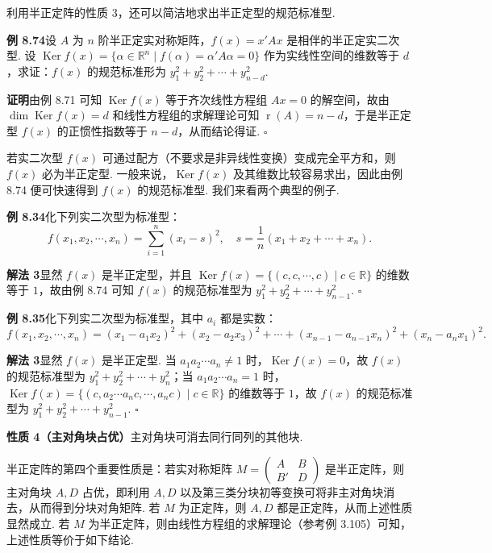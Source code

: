 \documentclass[UTF8,12pt,a4paper,fontset=fandol]{ctexart}
\begin{document}
利用半正定阵的性质 3，还可以简洁地求出半正定型的规范标准型.

\noindent\textbf{例 8.74}\quad 设 $A$ 为 $n$ 阶半正定实对称矩阵，$f(x)=x'Ax$ 是相伴的半正定实二次型. 设 $\operatorname{Ker} f(x)=\{\alpha\in\mathbb{R}^n\mid f(\alpha)=\alpha'A\alpha=0\}$ 作为实线性空间的维数等于 $d$，求证：$f(x)$ 的规范标准形为 $y_1^2+y_2^2+\cdots+y_{n-d}^2$.

\noindent\textbf{证明}\quad 由例 8.71 可知 $\operatorname{Ker} f(x)$ 等于齐次线性方程组 $Ax=0$ 的解空间，故由 $\dim\operatorname{Ker} f(x)=d$ 和线性方程组的求解理论可知 $\operatorname{r}(A)=n-d$，于是半正定型 $f(x)$ 的正惯性指数等于 $n-d$，从而结论得证. $\ensuremath{\square}$

若实二次型 $f(x)$ 可通过配方（不要求是非异线性变换）变成完全平方和，则 $f(x)$ 必为半正定型. 一般来说，$\operatorname{Ker}f(x)$ 及其维数比较容易求出，因此由例 8.74 便可快速得到 $f(x)$ 的规范标准型. 我们来看两个典型的例子.

\noindent\textbf{例 8.34}\quad 化下列实二次型为标准型：
\[
f(x_1,x_2,\cdots,x_n)=\sum_{i=1}^n(x_i-s)^2,\quad s=\frac1n(x_1+x_2+\cdots+x_n).
\]

\noindent\textbf{解法 3}\quad 显然 $f(x)$ 是半正定型，并且 $\operatorname{Ker}f(x)=\{(c,c,\cdots,c)\mid c\in\mathbb{R}\}$ 的维数等于 $1$，故由例 8.74 可知 $f(x)$ 的规范标准型为 $y_1^2+y_2^2+\cdots+y_{n-1}^2$. $\ensuremath{\square}$

\noindent\textbf{例 8.35}\quad 化下列实二次型为标准型，其中 $a_i$ 都是实数：
\[
f(x_1,x_2,\cdots,x_n)=(x_1-a_1x_2)^2+(x_2-a_2x_3)^2+\cdots+(x_{n-1}-a_{n-1}x_n)^2+(x_n-a_nx_1)^2.
\]

\noindent\textbf{解法 3}\quad 显然 $f(x)$ 是半正定型. 当 $a_1a_2\cdots a_n\ne 1$ 时，$\operatorname{Ker}f(x)=0$，故 $f(x)$ 的规范标准型为 $y_1^2+y_2^2+\cdots+y_n^2$；当 $a_1a_2\cdots a_n=1$ 时，$\operatorname{Ker}f(x)=\{(c,a_2\cdots a_nc,\cdots,a_nc)\mid c\in\mathbb{R}\}$ 的维数等于 $1$，故 $f(x)$ 的规范标准型为 $y_1^2+y_2^2+\cdots+y_{n-1}^2$. $\ensuremath{\square}$

\noindent\textbf{性质 4（主对角块占优）}\quad 主对角块可消去同行同列的其他块.

半正定阵的第四个重要性质是：若实对称矩阵 $M=\left(\begin{array}{cc}A&B\\ B'&D\end{array}\right)$ 是半正定阵，则主对角块 $A,D$ 占优，即利用 $A,D$ 以及第三类分块初等变换可将非主对角块消去，从而得到分块对角矩阵. 若 $M$ 为正定阵，则 $A,D$ 都是正定阵，从而上述性质显然成立. 若 $M$ 为半正定阵，则由线性方程组的求解理论（参考例 3.105）可知，上述性质等价于如下结论.
\end{document}
